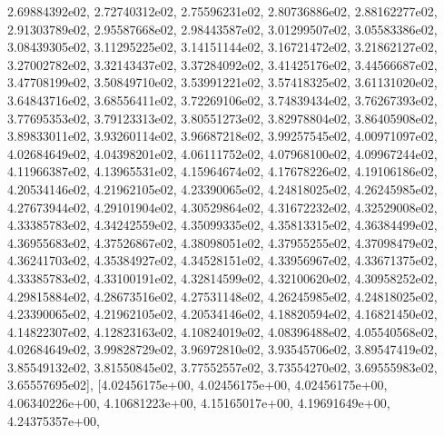 \documentclass[letterpaper,10pt,english]{sphinxmanual}
\begin{document}
\begin{fulllineitems}
2.69884392e\sphinxhyphen{}02, 2.72740312e\sphinxhyphen{}02, 2.75596231e\sphinxhyphen{}02, 2.80736886e\sphinxhyphen{}02, 2.88162277e\sphinxhyphen{}02, 2.91303789e\sphinxhyphen{}02, 2.95587668e\sphinxhyphen{}02, 2.98443587e\sphinxhyphen{}02, 3.01299507e\sphinxhyphen{}02, 3.05583386e\sphinxhyphen{}02, 3.08439305e\sphinxhyphen{}02, 3.11295225e\sphinxhyphen{}02, 3.14151144e\sphinxhyphen{}02, 3.16721472e\sphinxhyphen{}02, 3.21862127e\sphinxhyphen{}02, 3.27002782e\sphinxhyphen{}02, 3.32143437e\sphinxhyphen{}02, 3.37284092e\sphinxhyphen{}02, 3.41425176e\sphinxhyphen{}02, 3.44566687e\sphinxhyphen{}02, 3.47708199e\sphinxhyphen{}02, 3.50849710e\sphinxhyphen{}02, 3.53991221e\sphinxhyphen{}02, 3.57418325e\sphinxhyphen{}02, 3.61131020e\sphinxhyphen{}02, 3.64843716e\sphinxhyphen{}02, 3.68556411e\sphinxhyphen{}02, 3.72269106e\sphinxhyphen{}02, 3.74839434e\sphinxhyphen{}02, 3.76267393e\sphinxhyphen{}02, 3.77695353e\sphinxhyphen{}02, 3.79123313e\sphinxhyphen{}02, 3.80551273e\sphinxhyphen{}02, 3.82978804e\sphinxhyphen{}02, 3.86405908e\sphinxhyphen{}02, 3.89833011e\sphinxhyphen{}02, 3.93260114e\sphinxhyphen{}02, 3.96687218e\sphinxhyphen{}02, 3.99257545e\sphinxhyphen{}02, 4.00971097e\sphinxhyphen{}02, 4.02684649e\sphinxhyphen{}02, 4.04398201e\sphinxhyphen{}02, 4.06111752e\sphinxhyphen{}02, 4.07968100e\sphinxhyphen{}02, 4.09967244e\sphinxhyphen{}02, 4.11966387e\sphinxhyphen{}02, 4.13965531e\sphinxhyphen{}02, 4.15964674e\sphinxhyphen{}02, 4.17678226e\sphinxhyphen{}02, 4.19106186e\sphinxhyphen{}02, 4.20534146e\sphinxhyphen{}02, 4.21962105e\sphinxhyphen{}02, 4.23390065e\sphinxhyphen{}02, 4.24818025e\sphinxhyphen{}02, 4.26245985e\sphinxhyphen{}02, 4.27673944e\sphinxhyphen{}02, 4.29101904e\sphinxhyphen{}02, 4.30529864e\sphinxhyphen{}02, 4.31672232e\sphinxhyphen{}02, 4.32529008e\sphinxhyphen{}02, 4.33385783e\sphinxhyphen{}02, 4.34242559e\sphinxhyphen{}02, 4.35099335e\sphinxhyphen{}02, 4.35813315e\sphinxhyphen{}02, 4.36384499e\sphinxhyphen{}02, 4.36955683e\sphinxhyphen{}02, 4.37526867e\sphinxhyphen{}02, 4.38098051e\sphinxhyphen{}02, 4.37955255e\sphinxhyphen{}02, 4.37098479e\sphinxhyphen{}02, 4.36241703e\sphinxhyphen{}02, 4.35384927e\sphinxhyphen{}02, 4.34528151e\sphinxhyphen{}02, 4.33956967e\sphinxhyphen{}02, 4.33671375e\sphinxhyphen{}02, 4.33385783e\sphinxhyphen{}02, 4.33100191e\sphinxhyphen{}02, 4.32814599e\sphinxhyphen{}02, 4.32100620e\sphinxhyphen{}02, 4.30958252e\sphinxhyphen{}02, 4.29815884e\sphinxhyphen{}02, 4.28673516e\sphinxhyphen{}02, 4.27531148e\sphinxhyphen{}02, 4.26245985e\sphinxhyphen{}02, 4.24818025e\sphinxhyphen{}02, 4.23390065e\sphinxhyphen{}02, 4.21962105e\sphinxhyphen{}02, 4.20534146e\sphinxhyphen{}02, 4.18820594e\sphinxhyphen{}02, 4.16821450e\sphinxhyphen{}02, 4.14822307e\sphinxhyphen{}02, 4.12823163e\sphinxhyphen{}02, 4.10824019e\sphinxhyphen{}02, 4.08396488e\sphinxhyphen{}02, 4.05540568e\sphinxhyphen{}02, 4.02684649e\sphinxhyphen{}02, 3.99828729e\sphinxhyphen{}02, 3.96972810e\sphinxhyphen{}02, 3.93545706e\sphinxhyphen{}02, 3.89547419e\sphinxhyphen{}02, 3.85549132e\sphinxhyphen{}02, 3.81550845e\sphinxhyphen{}02, 3.77552557e\sphinxhyphen{}02, 3.73554270e\sphinxhyphen{}02, 3.69555983e\sphinxhyphen{}02, 3.65557695e\sphinxhyphen{}02{]}, {[}4.02456175e+00, 4.02456175e+00, 4.02456175e+00, 4.06340226e+00, 4.10681223e+00, 4.15165017e+00, 4.19691649e+00, 4.24375357e+00, 
\end{fulllineitems}
\end{document}
